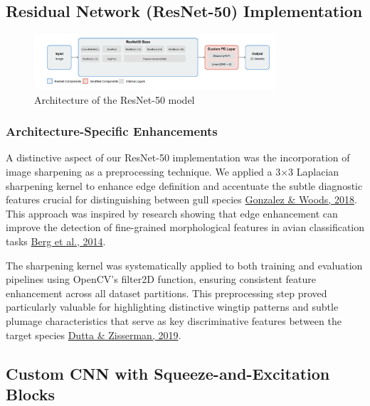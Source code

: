 \documentclass[a4paper,12pt]{report}
\begin{document}
\subsection{Residual Network (ResNet-50) Implementation}

\begin{figure}[h]
    \centering
    \includegraphics[width=0.8\textwidth]{images/architecture/resnet.png}
    \caption{Architecture of the ResNet-50 model}
    \label{fig:resnet_architecture}
\end{figure}

\subsubsection{Architecture-Specific Enhancements}

A distinctive aspect of our ResNet-50 implementation was the incorporation of image sharpening as a preprocessing technique. We applied a 3×3 Laplacian sharpening kernel to enhance edge definition and accentuate the subtle diagnostic features crucial for distinguishing between gull species {\href{https://www.pearson.com/en-us/subject-catalog/p/digital-image-processing/P200000003546}{Gonzalez \& Woods, 2018}}. This approach was inspired by research showing that edge enhancement can improve the detection of fine-grained morphological features in avian classification tasks {\href{https://openaccess.thecvf.com/content_cvpr_2014/papers/Berg_Birdsnap_Large-scale_Fine-grained_2014_CVPR_paper.pdf}{Berg et al., 2014}}.

The sharpening kernel was systematically applied to both training and evaluation pipelines using OpenCV's filter2D function, ensuring consistent feature enhancement across all dataset partitions. This preprocessing step proved particularly valuable for highlighting distinctive wingtip patterns and subtle plumage characteristics that serve as key discriminative features between the target species {\href{https://ieeexplore.ieee.org/document/8659085}{Dutta \& Zisserman, 2019}}.

\subsection{Custom CNN with Squeeze-and-Excitation Blocks}
\end{document}
